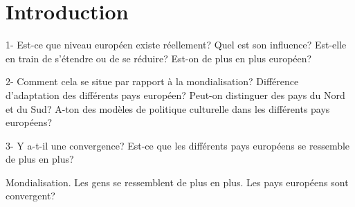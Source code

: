 \chapter*{Introduction}

1- Est-ce que niveau européen existe réellement? Quel est son influence? Est-elle en train de s'étendre ou de se réduire? Est-on de plus en plus européen? 

2- Comment cela se situe par rapport à la mondialisation? Différence d'adaptation des différents pays européen? Peut-on distinguer des pays du Nord et du Sud? A-ton des modèles de politique culturelle dans les différents pays européens? 

3- Y a-t-il une convergence? Est-ce que les différents pays européens se ressemble de plus en plus? 

Mondialisation. Les gens se ressemblent de plus en plus. Les pays européens sont convergent? 
